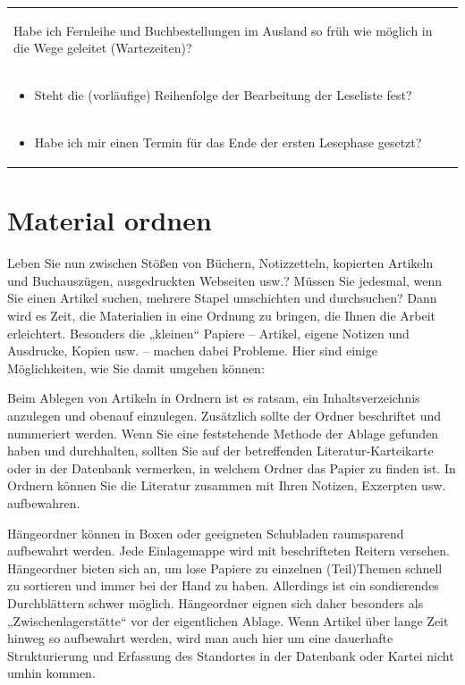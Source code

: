 \documentclass[]{book}
\providecommand{\tightlist}{%
  \setlength{\itemsep}{0pt}\setlength{\parskip}{0pt}}
\theoremstyle{definition}
\theoremstyle{definition}
\theoremstyle{definition}
\theoremstyle{remark}
\begin{document}
\begin{longtable}[]{@{}l@{}}
\begin{minipage}[t]{0.97\columnwidth}
\begin{itemize}
  Habe ich Fernleihe und Buchbestellungen im Ausland so früh wie möglich
  in die Wege geleitet (Wartezeiten)?\vspace{-6mm}
\end{itemize}\strut
\end{minipage}\tabularnewline
\begin{minipage}[t]{0.97\columnwidth}\raggedright\strut
\begin{itemize}
\tightlist
\item
  Steht die (vorläufige) Reihenfolge der Bearbeitung der Leseliste fest?
  \vspace{-6mm}
\end{itemize}\strut
\end{minipage}\tabularnewline
\begin{minipage}[t]{0.97\columnwidth}\raggedright\strut
\begin{itemize}
\tightlist
\item
  Habe ich mir einen Termin für das Ende der ersten Lesephase gesetzt?
\end{itemize}\strut
\end{minipage}\tabularnewline
\bottomrule
\end{longtable}

\section{Material ordnen}\label{material-ordnen}

Leben Sie nun zwischen Stößen von Büchern, Notizzetteln, kopierten
Artikeln und Buchauszügen, ausgedruckten Webseiten usw.? Müssen Sie
jedesmal, wenn Sie einen Artikel suchen, mehrere Stapel umschichten und
durchsuchen? Dann wird es Zeit, die Materialien in eine Ordnung zu
bringen, die Ihnen die Arbeit erleichtert. Besonders die „kleinen``
Papiere -- Artikel, eigene Notizen und Ausdrucke, Kopien usw. -- machen
dabei Probleme. Hier sind einige Möglichkeiten, wie Sie damit umgehen
können:

Beim Ablegen von Artikeln in Ordnern ist es ratsam, ein
Inhaltsverzeichnis anzulegen und obenauf einzulegen. Zusätzlich sollte
der Ordner beschriftet und nummeriert werden. Wenn Sie eine feststehende
Methode der Ablage gefunden haben und durchhalten, sollten Sie auf der
betreffenden Literatur-Karteikarte oder in der Datenbank vermerken, in
welchem Ordner das Papier zu finden ist. In Ordnern können Sie die
Literatur zusammen mit Ihren Notizen, Exzerpten usw. aufbewahren.

Hängeordner können in Boxen oder geeigneten Schubladen raumsparend
aufbewahrt werden. Jede Einlagemappe wird mit beschrifteten Reitern
versehen. Hängeordner bieten sich an, um lose Papiere zu einzelnen
(Teil)Themen schnell zu sortieren und immer bei der Hand zu haben.
Allerdings ist ein sondierendes Durchblättern schwer möglich.
Hängeordner eignen sich daher besonders als „Zwischenlagerstätte`` vor
der eigentlichen Ablage. Wenn Artikel über lange Zeit hinweg so
aufbewahrt werden, wird man auch hier um eine dauerhafte Strukturierung
und Erfassung des Standortes in der Datenbank oder Kartei nicht umhin
kommen.
\end{document}
